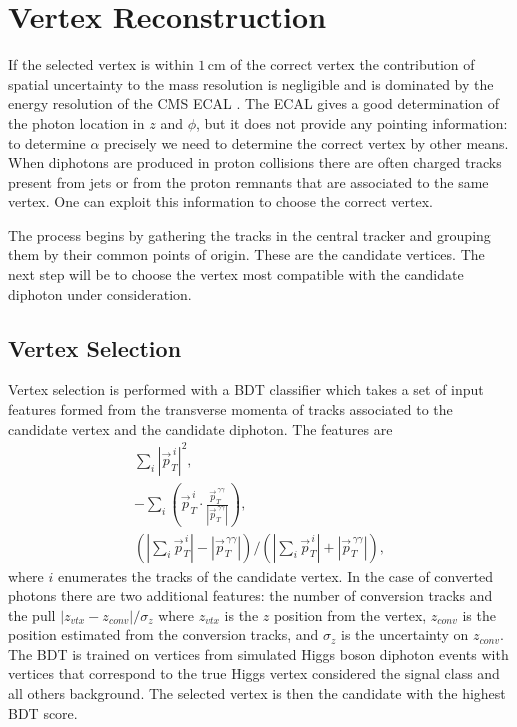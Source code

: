 \section{Vertex Reconstruction}
If the selected vertex is within $1$\,cm of the correct vertex the contribution of spatial uncertainty to the mass resolution is negligible and is dominated by the energy resolution of the CMS ECAL \cite{HIG-16-040}. 
The ECAL gives a good determination of the photon location in $z$ and $\phi$, but it does not provide any pointing information: to determine $\alpha$ precisely we need to determine the correct vertex by other means.
When diphotons are produced in proton collisions there are often charged tracks present from jets or from the proton remnants that are associated to the same vertex. One can exploit this information to choose the correct vertex.  


The process begins by gathering the tracks in the central tracker and grouping them by their common points of origin. These are the candidate vertices. The next step will be to choose the vertex most compatible with the candidate diphoton under consideration.

\subsection{Vertex Selection}
Vertex selection is performed with a BDT classifier which takes a set of input features formed from the transverse momenta of tracks associated to the candidate vertex and the candidate diphoton. The features are
\begin{gather*}
    \sum_{i}|\vec{p}_{T}^{\,i}|^{2}, \\
    -\sum_{i}(\vec{p}_{T}^{\,i}\cdot\frac{\vec{p}_{T}^{\,\gamma\gamma}}{|\vec{p}_{T}^{\,\gamma\gamma}|}), \\
    (|\sum_{i}\vec{p}_{T}^{\,i}|-|\vec{p}_{T}^{\,\gamma\gamma}|)/(|\sum_{i}\vec{p}_{T}^{\,i}|+|\vec{p}_{T}^{\,\gamma\gamma}|),
\end{gather*}
where $i$ enumerates the tracks of the candidate vertex. In the case of converted photons there are two additional features: the number of conversion tracks and the pull $|z_{vtx} - z_{conv}|/\sigma_{z}$ where $z_{vtx}$ is the $z$ position from the vertex, $z_{conv}$ is the position estimated from the conversion tracks, and $\sigma_z$ is the uncertainty on $z_{conv}$.
The BDT is trained on vertices from simulated Higgs boson diphoton events with vertices that correspond to the true Higgs vertex considered the signal class and all others background. The selected vertex is then the candidate with the highest BDT score. 



